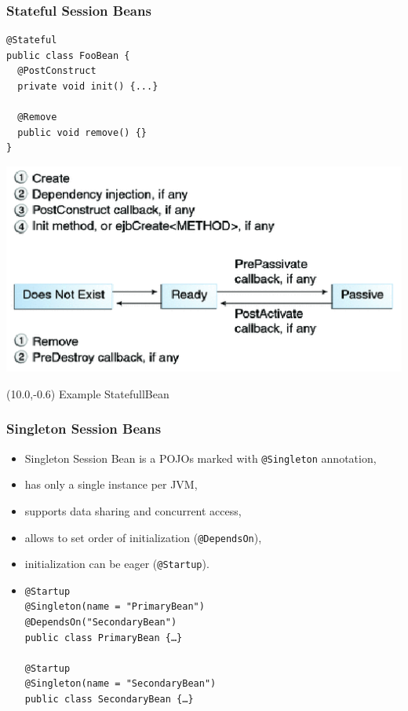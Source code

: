 \documentclass[10pt,xcolor=pdflatex]{beamer}
\begin{document}
\begin{frame}[fragile]\frametitle{Stateful Session Beans}
\begin{small}
	\begin{verbatim}
@Stateful
public class FooBean {
  @PostConstruct
  private void init() {...}

  @Remove
  public void remove() {}
}
	\end{verbatim}\end{small}
	\includegraphics[scale=0.7]{img/obr2}
\begin{textblock}{10}(10.0,-0.6)
    {\footnotesize Example StatefullBean}
\end{textblock}
\end{frame}


\begin{frame}[fragile]\frametitle{Singleton Session Beans}
	\begin{itemize}
		\item Singleton Session Bean is a POJOs marked with \texttt{@Singleton} annotation,
		\item has only a single instance per JVM,
		\item supports data sharing and concurrent access,
		\item allows to set order of initialization (\texttt{@DependsOn}),
		\item initialization can be eager (\texttt{@Startup}).
		\item[]
        	\medskip
        	\begin{verbatim}
@Startup
@Singleton(name = "PrimaryBean")
@DependsOn("SecondaryBean")
public class PrimaryBean {…}

@Startup
@Singleton(name = "SecondaryBean")
public class SecondaryBean {…}
			\end{verbatim}
	\end{itemize}
\end{frame}
\end{document}
